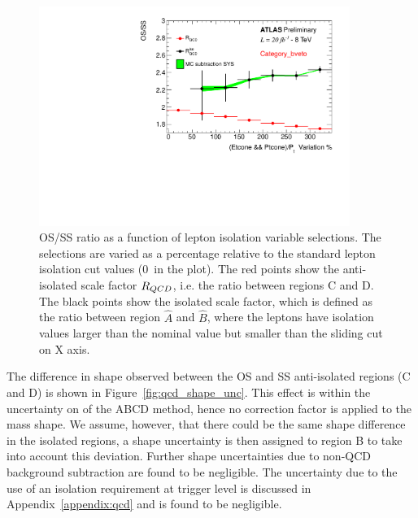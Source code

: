 \begin{figure}[tp]
	\begin{center}
	\includegraphics[page=5,width=0.9\textwidth]{figure/QCD/qcd_plot.pdf}
	\end{center}
	\caption{OS/SS ratio as a function of lepton isolation variable selections. The selections are varied as a percentage relative to
	the standard lepton isolation cut values (0~in the plot). 
	The red points show the anti-isolated scale factor $R_{QCD}$, i.e. the ratio between regions C and D.
	 The black points show the isolated scale factor, which is defined as the ratio between region $\hat{A}$ and $\hat{B}$, 
	 where the leptons have isolation values larger than the nominal value but smaller
	 than the sliding cut on X axis.
	 }
	\label{fig:os_ss_ratio}
\end{figure}

The difference in \mmc shape observed between the OS and SS anti-isolated regions (C and D) is shown in Figure~\ref{fig:qcd_shape_unc}.
This effect is within the  uncertainty on \rqcd of the ABCD method, hence no correction factor is applied to the mass shape. We assume, however, that there could be the same 
shape difference in the isolated regions, a shape uncertainty is then assigned to region B to take into account this  deviation. Further 
shape uncertainties due to non-QCD background subtraction are found to be negligible. The uncertainty due to the use of an isolation 
requirement at trigger level is discussed in Appendix~\ref{appendix:qcd} and is found to be negligible.


